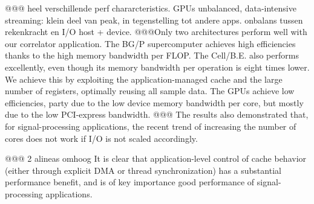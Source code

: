 \documentclass{article}
\begin{document}
@@@
heel verschillende perf chararcteristics. GPUs unbalanced, data-intensive streaming: 
klein deel van peak, in tegenstelling tot andere apps.
onbalans tussen rekenkracht en I/O host + device.
@@@Only two architectures perform well with our correlator application.  The BG/P
supercomputer achieves high efficiencies thanks to the high memory
bandwidth per FLOP.  The \mbox{Cell/B.E.} also performs excellently,
even though its memory bandwidth per operation is eight times lower.
We achieve this by exploiting the application-managed cache and the
large number of registers, optimally reusing all sample data.
The GPUs achieve low efficiencies, party due to the low device memory bandwidth per core,
but mostly due to the low PCI-express bandwidth.
@@@
The results also demonstrated that, for signal-processing 
applications, the recent trend of increasing the number of
cores does not work if I/O is not scaled accordingly.


@@@ 2 alineas omhoog
It is clear that application-level control of cache behavior (either
through explicit DMA or thread synchronization) has a substantial
performance benefit, and is of key importance good performance of signal-processing
applications.  






\begin{small}

\end{small}
\end{document}
